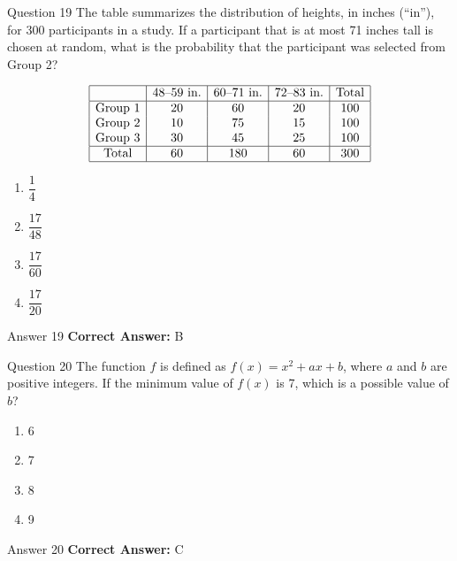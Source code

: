 \documentclass{beamer}
\begin{document}
\begin{frame}{Question 19}
\small
The table summarizes the distribution of heights, in inches (``in''), for 300 participants in a study. If a participant that is at most 71 inches tall is chosen at random, what is the probability that the participant was selected from Group 2?

\[
\begin{array}{|c|c|c|c|c|}
\hline
 & \text{48--59 in.} & \text{60--71 in.} & \text{72--83 in.} & \text{Total} \\
\hline
\text{Group 1} & 20 & 60 & 20 & 100 \\
\text{Group 2} & 10 & 75 & 15 & 100 \\
\text{Group 3} & 30 & 45 & 25 & 100 \\
\hline
\text{Total} & 60 & 180 & 60 & 300 \\
\hline
\end{array}
\]
\vspace{0.35cm}
\begin{enumerate}
    \item[A.] \(\dfrac{1}{4}\)
    \item[B.] \(\dfrac{17}{48}\)
    \item[C.] \(\dfrac{17}{60}\)
    \item[D.] \(\dfrac{17}{20}\)
\end{enumerate}
\end{frame}
\begin{frame}{Answer 19}
\small
\textbf{Correct Answer:} B
\end{frame}

\begin{frame}{Question 20}
\small
The function \(f\) is defined as \(f(x) = x^2 + ax + b\), where \(a\) and \(b\) are positive integers. If the minimum value of \(f(x)\) is 7, which is a possible value of \(b\)?
\vspace{0.35cm}
\begin{enumerate}
    \item[A.] 6
    \item[B.] 7
    \item[C.] 8
    \item[D.] 9
\end{enumerate}
\end{frame}
\begin{frame}{Answer 20}
\small
\textbf{Correct Answer:} C
\end{frame}
\end{document}
